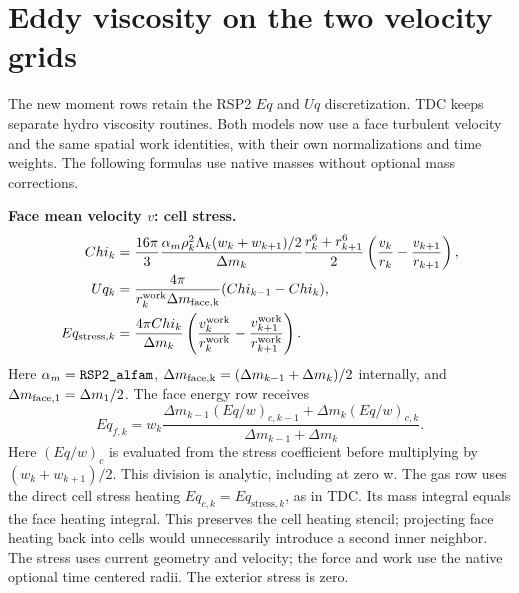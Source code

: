 \documentclass[11pt]{article}
\newcommand{\code}[1]{\texttt{\detokenize{#1}}}
\numberwithin{equation}{section}
\begin{document}
\section{Eddy viscosity on the two velocity grids}
The new moment rows retain the RSP2 $Eq$ and $Uq$ discretization.
TDC keeps separate hydro viscosity routines. Both models now use a face
turbulent velocity and the same spatial work identities, with their own
normalizations and time weights.
The following formulas use native masses without optional mass corrections.

\textbf{Face mean velocity $v$: cell stress.}
\begin{align}
 Chi_k&=\frac{16\pi}{3}\frac{\alpha_m\rho_k^2\Lambda_k(w_k+w_{k+1})/2}{\Delta m_k}
       \frac{r_k^6+r_{k+1}^6}{2}
       \left(\frac{v_k}{r_k}-\frac{v_{k+1}}{r_{k+1}}\right),\\
 Uq_k&=\frac{4\pi}{r_k^{\rm work}\Delta m_{\rm face,k}}
                          (Chi_{k-1}-Chi_k),\\
 Eq_{\mathrm{stress},k}&=\frac{4\pi Chi_k}{\Delta m_k}
       \left(\frac{v_k^{\rm work}}{r_k^{\rm work}}
              -\frac{v_{k+1}^{\rm work}}{r_{k+1}^{\rm work}}\right).
\end{align}
Here $\alpha_m=\code{RSP2_alfam}$,
$\Delta m_{\rm face,k}=(\Delta m_{k-1}+\Delta m_k)/2$ internally,
and $\Delta m_{\rm face,1}=\Delta m_1/2$.
The face energy row receives
\begin{equation}
 Eq_{f,k}=w_k\frac{\Delta m_{k-1}(Eq/w)_{c,k-1}+\Delta m_k(Eq/w)_{c,k}}
 {\Delta m_{k-1}+\Delta m_k}.
\end{equation}
Here $(Eq/w)_c$ is evaluated from the stress coefficient before multiplying
by $(w_k+w_{k+1})/2$. This division is analytic, including at zero w.
The gas row uses the direct cell stress heating $Eq_{c,k}=Eq_{\mathrm{stress},k}$,
as in TDC. Its mass integral equals the face heating integral. This preserves
the cell heating stencil; projecting face heating back into cells would
unnecessarily introduce a second inner neighbor.
The stress uses current geometry and velocity; the force and work use the
native optional time centered radii. The exterior stress is zero.
\end{document}
